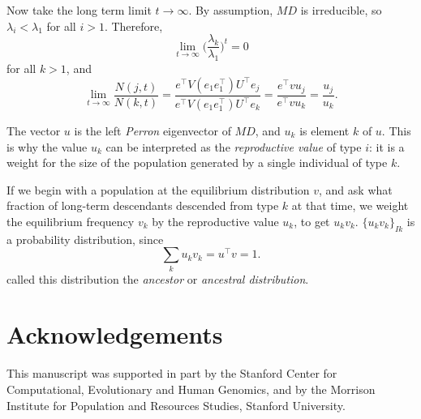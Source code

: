 \documentclass[9pt, a4paper, twocolumn]{extarticle}   	%
\newcommand*{\tr}{^\intercal}
\newcommand{\goesto}{\rightarrow}
\begin{document}
Now take the long term limit $t \goesto \infty$.
By assumption, $MD$ is irreducible, so $\lambda_i < \lambda_1$ for all $i > 1$.
Therefore,
\begin{equation}
\lim_{t \goesto \infty} \Big( \frac{\lambda_k}{\lambda_1} \Big)^t = 0
\end{equation}
for all $k > 1$, and
\begin{equation}
\lim_{t \goesto \infty}\frac{N(j,t)}{N(k,t)} =
\frac{e\tr V (e_1 e_1\tr) U\tr e_j} { e\tr V (e_1 e_1\tr) U\tr e_k} = 
\frac{ e\tr v u_j} { e\tr v  u_k} =
\frac{u_j} {u_k}.
\end{equation}

The vector $u$ is the left \emph{Perron} eigenvector of $MD$, and $u_k$ is element $k$ of $u$.
This is why the value $u_k$ can be interpreted as the \emph{reproductive value} of type $i$: it is a weight for the size of the population generated by a single individual of type $k$.

If we begin with a population at the equilibrium distribution $v$,
and ask what fraction of long-term descendants descended from type $k$ at that time,
we weight the equilibrium frequency $v_k$ by the reproductive value $u_k$, to get $u_k v_k$.
$\{u_k v_k\}_{Ik}$ is a probability distribution, since
\begin{equation}
\sum_k {u_k v_k} = u\tr v = 1.
\end{equation}
\citet{Hermisson2002} called this distribution the \emph{ancestor} or \emph{ancestral distribution}.

{\small
\section*{Acknowledgements}

This manuscript was supported in part by the Stanford Center for Computational, Evolutionary and Human Genomics, and by the Morrison Institute for Population and Resources Studies, Stanford University.
}



\end{document}
